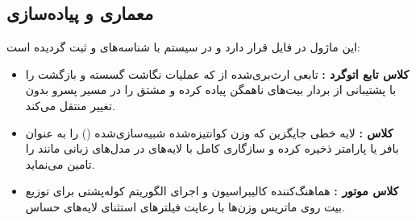 \subsection{معماری و پیاده‌سازی}
این ماژول در فایل  قرار دارد و در سیستم با شناسه‌های  و  ثبت گردیده است:
\begin{itemize}
    \item \textbf{کلاس تابع اتوگرد :} تابعی ارث‌بری‌شده از  که عملیات نگاشت گسسته و بازگشت را با پشتیبانی از بردار بیت‌های ناهمگن پیاده کرده و مشتق را در مسیر پسرو بدون تغییر منتقل می‌کند.
    \item \textbf{کلاس :} لایه خطی جایگزین که وزن کوانتیزه‌شده شبیه‌سازی‌شده () را به عنوان بافر یا پارامتر ذخیره کرده و سازگاری کامل با لایه‌های  در مدل‌های زبانی مانند  را تامین می‌نماید.
    \item \textbf{کلاس موتور :} هماهنگ‌کننده کالیبراسیون و اجرای الگوریتم کوله‌پشتی برای توزیع بیت روی ماتریس وزن‌ها با رعایت فیلترهای استثنای لایه‌های حساس.
\end{itemize}
